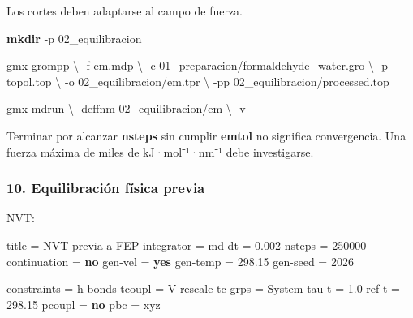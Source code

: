 \documentclass[
  spanish,
  11pt,
  a4paper]{article}
\newenvironment{Shaded}{\begin{snugshade}}{\end{snugshade}}
\newcommand{\AttributeTok}[1]{\textcolor[rgb]{0.13,0.29,0.53}{#1}}
\newcommand{\DataTypeTok}[1]{\textcolor[rgb]{0.13,0.29,0.53}{#1}}
\newcommand{\DecValTok}[1]{\textcolor[rgb]{0.00,0.00,0.81}{#1}}
\newcommand{\ExtensionTok}[1]{#1}
\newcommand{\FloatTok}[1]{\textcolor[rgb]{0.00,0.00,0.81}{#1}}
\newcommand{\FunctionTok}[1]{\textcolor[rgb]{0.13,0.29,0.53}{\textbf{#1}}}
\newcommand{\KeywordTok}[1]{\textcolor[rgb]{0.13,0.29,0.53}{\textbf{#1}}}
\newcommand{\NormalTok}[1]{#1}
\newcommand{\OtherTok}[1]{\textcolor[rgb]{0.56,0.35,0.01}{#1}}
\newcommand{\StringTok}[1]{\textcolor[rgb]{0.31,0.60,0.02}{#1}}
\begin{document}
Los cortes deben adaptarse al campo de fuerza.

\begin{Shaded}
\begin{Highlighting}[]
\FunctionTok{mkdir} \AttributeTok{{-}p}\NormalTok{ 02\_equilibracion}

\ExtensionTok{gmx}\NormalTok{ grompp }\DataTypeTok{\textbackslash{}}
    \AttributeTok{{-}f}\NormalTok{ em.mdp }\DataTypeTok{\textbackslash{}}
    \AttributeTok{{-}c}\NormalTok{ 01\_preparacion/formaldehyde\_water.gro }\DataTypeTok{\textbackslash{}}
    \AttributeTok{{-}p}\NormalTok{ topol.top }\DataTypeTok{\textbackslash{}}
    \AttributeTok{{-}o}\NormalTok{ 02\_equilibracion/em.tpr }\DataTypeTok{\textbackslash{}}
    \AttributeTok{{-}pp}\NormalTok{ 02\_equilibracion/processed.top}

\ExtensionTok{gmx}\NormalTok{ mdrun }\DataTypeTok{\textbackslash{}}
    \AttributeTok{{-}deffnm}\NormalTok{ 02\_equilibracion/em }\DataTypeTok{\textbackslash{}}
    \AttributeTok{{-}v}
\end{Highlighting}
\end{Shaded}

Terminar por alcanzar \textbf{nsteps} sin cumplir \textbf{emtol} no
significa convergencia. Una fuerza máxima de miles de kJ·mol⁻¹·nm⁻¹ debe
investigarse.

\subsubsection{10. Equilibración física
previa}\label{equilibraciuxf3n-fuxedsica-previa}

NVT:

\begin{Shaded}
\begin{Highlighting}[]
\DataTypeTok{title         }\OtherTok{=}\StringTok{ NVT previa a FEP}
\DataTypeTok{integrator    }\OtherTok{=}\StringTok{ md}
\DataTypeTok{dt            }\OtherTok{=}\StringTok{ }\FloatTok{0.002}
\DataTypeTok{nsteps        }\OtherTok{=}\StringTok{ }\DecValTok{250000}
\DataTypeTok{continuation  }\OtherTok{=}\StringTok{ }\KeywordTok{no}
\DataTypeTok{gen{-}vel       }\OtherTok{=}\StringTok{ }\KeywordTok{yes}
\DataTypeTok{gen{-}temp      }\OtherTok{=}\StringTok{ }\FloatTok{298.15}
\DataTypeTok{gen{-}seed      }\OtherTok{=}\StringTok{ }\DecValTok{2026}

\DataTypeTok{constraints   }\OtherTok{=}\StringTok{ h{-}bonds}
\DataTypeTok{tcoupl        }\OtherTok{=}\StringTok{ V{-}rescale}
\DataTypeTok{tc{-}grps       }\OtherTok{=}\StringTok{ System}
\DataTypeTok{tau{-}t         }\OtherTok{=}\StringTok{ }\FloatTok{1.0}
\DataTypeTok{ref{-}t         }\OtherTok{=}\StringTok{ }\FloatTok{298.15}
\DataTypeTok{pcoupl        }\OtherTok{=}\StringTok{ }\KeywordTok{no}
\DataTypeTok{pbc           }\OtherTok{=}\StringTok{ xyz}
\end{Highlighting}
\end{Shaded}
\end{document}
